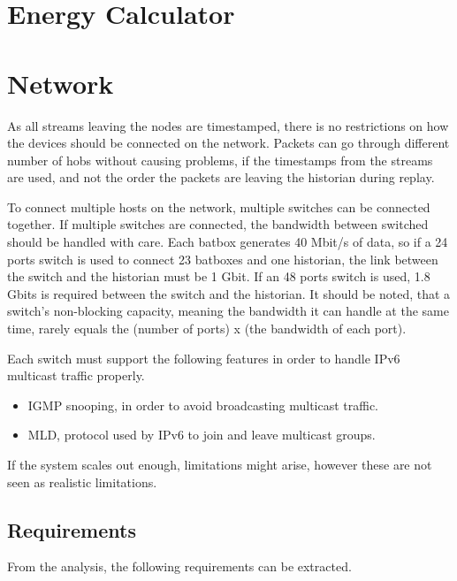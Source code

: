 \section{Energy Calculator}


\section{Network}
As all streams leaving the nodes are timestamped, there is no restrictions on how the devices should be connected on the network. Packets can go through different number of hobs without causing problems, if the timestamps from the streams are used, and not the order the packets are leaving the historian during replay.

To connect multiple hosts on the network, multiple switches can be connected together. If multiple switches are connected, the bandwidth between switched should be handled with care. Each batbox generates 40 Mbit/s of data, so if a 24 ports switch is used to connect 23 batboxes and one historian, the link between the switch and the historian must be 1 Gbit. If an 48 ports switch is used, 1.8 Gbits is required between the switch and the historian. It should be noted, that a switch's non-blocking capacity, meaning the bandwidth it can handle at the same time, rarely equals the (number of ports) x (the bandwidth of each port).

Each switch must support the following features in order to handle IPv6 multicast traffic properly.

\begin{itemize}
	 \item IGMP snooping, in order to avoid broadcasting multicast traffic.
	 \item MLD, protocol used by IPv6 to join and leave multicast groups.
\end{itemize}

If the system scales out enough, limitations might arise, however these are not seen as realistic limitations.


\subsection{Requirements}
From the analysis, the following requirements can be extracted.
